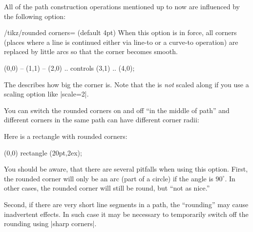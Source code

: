 All of the path construction operations mentioned up to now are
influenced by the following option:
\begin{key}{/tikz/rounded corners= (default 4pt)}
  When this option is in force, all corners (places where a line is
  continued either via line-to or a curve-to operation) are replaced by
  little arcs so that the corner becomes smooth.

\begin{codeexample}[]
\tikz {} (0,0) -- (1,1)
           -- (2,0) .. controls (3,1) .. (4,0);
\end{codeexample}

  The  describes how big the corner is. Note that the
   is \emph{not} scaled along if you use a scaling option
  like |scale=2|.

\begin{codeexample}[]
\end{codeexample}

  You can switch the rounded corners on and off ``in the middle of
  path'' and different corners in the same path can have different
  corner radii:

\begin{codeexample}[]
\end{codeexample}

Here is a rectangle with rounded corners:
\begin{codeexample}[]
\tikz \draw[rounded corners=1ex] (0,0) rectangle (20pt,2ex);
\end{codeexample}

  You should be aware, that there are several pitfalls when using this
  option. First, the rounded corner will only be an arc (part of a
  circle) if the angle is $90^\circ$. In other cases, the rounded
  corner will still be round, but ``not as nice.''

  Second, if there are very short line segments in a path, the
  ``rounding'' may cause inadvertent effects. In such case it may be
  necessary to temporarily switch off the rounding using
  |sharp corners|.
\end{key}

